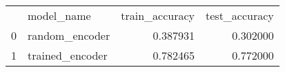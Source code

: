 \begin{tabular}{llrr}
 & model_name & train_accuracy & test_accuracy \\
0 & random_encoder & 0.387931 & 0.302000 \\
1 & trained_encoder & 0.782465 & 0.772000 \\
\end{tabular}
